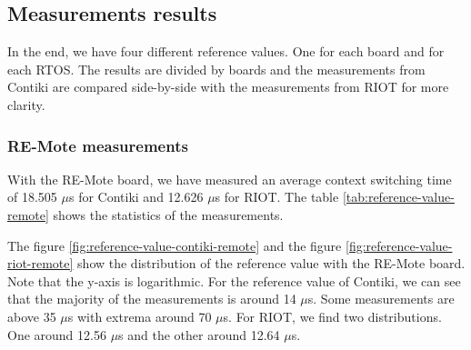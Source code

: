 \subsection{Measurements results\label{sec:ref-measurements}}

In the end, we have four different reference values.
One for each board and for each RTOS.
The results are divided by boards and the measurements from Contiki are compared side-by-side with the measurements from RIOT for more clarity.

\subsubsection{RE-Mote measurements}
With the RE-Mote board, we have measured an average context switching time of 18.505 $\mu$s for Contiki and  12.626 $\mu$s for RIOT.
The table \ref{tab:reference-value-remote} shows the statistics of the measurements.



The figure \ref{fig:reference-value-contiki-remote} and the figure \ref{fig:reference-value-riot-remote} show the distribution of the reference value with the RE-Mote board.
Note that the y-axis is logarithmic.
For the reference value of Contiki, we can see that the majority of the measurements is around 14 $\mu$s.
Some measurements are above 35 $\mu$s with extrema around 70 $\mu$s.
For RIOT, we find two distributions.
One around 12.56 $\mu$s and the other around 12.64 $\mu$s.


